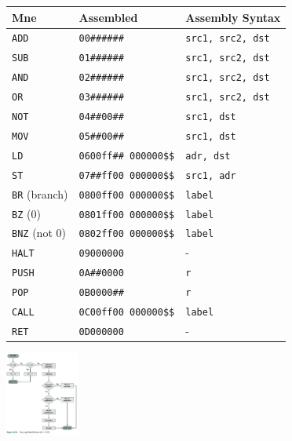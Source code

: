 \documentclass[a4paper]{article}
\begin{document}
\begin{multicols*}{2}
  \begin{minipage}{.26\textwidth}
    \begin{tabular}{|l|l|l|}
      \hline
      \textbf{Mne}         & \textbf{Assembled}             & \textbf{Assembly Syntax} \\
      \hline
      \texttt{ADD}         & \texttt{00\#\#\#\#\#\#}        & \texttt{src1, src2, dst} \\
      \texttt{SUB}         & \texttt{01\#\#\#\#\#\#}        & \texttt{src1, src2, dst} \\
      \texttt{AND}         & \texttt{02\#\#\#\#\#\#}        & \texttt{src1, src2, dst} \\
      \texttt{OR}          & \texttt{03\#\#\#\#\#\#}        & \texttt{src1, src2, dst} \\
      \texttt{NOT}         & \texttt{04\#\#00\#\#}          & \texttt{src1, dst}       \\
      \texttt{MOV}         & \texttt{05\#\#00\#\#}          & \texttt{src1, dst}       \\
      \texttt{LD}          & \texttt{0600ff\#\# 000000\$\$} & \texttt{adr, dst}        \\
      \texttt{ST}          & \texttt{07\#\#ff00 000000\$\$} & \texttt{src1, adr}       \\
      \texttt{BR} (branch) & \texttt{0800ff00 000000\$\$}   & \texttt{label}           \\
      \texttt{BZ} (0)      & \texttt{0801ff00 000000\$\$}   & \texttt{label}           \\
      \texttt{BNZ} (not 0) & \texttt{0802ff00 000000\$\$}   & \texttt{label}           \\
      \texttt{HALT}        & \texttt{09000000}              & -                        \\
      \texttt{PUSH}        & \texttt{0A\#\#0000}            & \texttt{r}               \\
      \texttt{POP}         & \texttt{0B0000\#\#}            & \texttt{r}               \\
      \texttt{CALL}        & \texttt{0C00ff00 000000\$\$}   & \texttt{label}           \\
      \texttt{RET}         & \texttt{0D000000}              & -                        \\
      \hline
    \end{tabular}
  \end{minipage}
  \begin{minipage}{1\textwidth}
    \includegraphics[width=0.18\textwidth]{./fp-division-flow.png}
  \end{minipage}


\end{multicols*}
\end{document}
